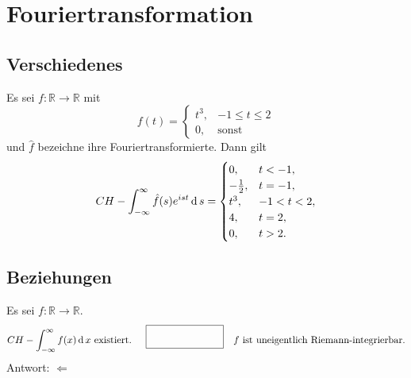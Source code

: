\section{Fouriertransformation}

\subsection{Verschiedenes}
Es sei $f : \mathbb{R} \to \mathbb{R}$ mit
\begin{displaymath}
  f(t) = 
  \begin{cases}
    t^3,& -1 \leq t \leq 2\\
    0,& \text{sonst}
  \end{cases}    
\end{displaymath}
und $\hat{f}$ bezeichne ihre Fouriertransformierte. 
Dann gilt
\begin{displaymath}
  CH - \int_{-\infty}^{\infty} \hat{f}(s) e^{ist} \operatorname{\mathop{}\!\mathrm{d}} s = 
  \begin{cases}
    0,& t < -1,\\
    -\frac{1}{2},& t = -1,\\
    t^3,& -1 < t < 2,\\
    4,& t = 2,\\
    0,& t > 2.\\
  \end{cases}
\end{displaymath}

\subsection{Beziehungen}
Es sei $f : \mathbb{R} \to \mathbb{R}$.
\begin{displaymath}
  CH - \int_{-\infty}^{\infty} f(x) \diff x \text{ existiert. }
  \quad \fbox{\rule{1in}{0pt}\rule[-0.5ex]{0pt}{4ex}} \quad
  f \text{ ist uneigentlich Riemann-integrierbar.}
\end{displaymath}
Antwort: $\Leftarrow$